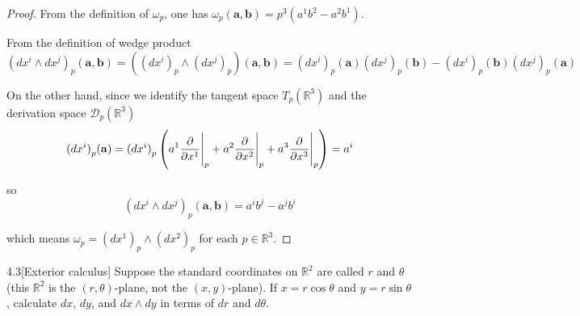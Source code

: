 \begin{proof}
	From the definition of \(\omega_{p}\), one has \(\omega_{p}(\mathbf{a}, \mathbf{b}) = p^{3}(a^{1}b^{2} - a^{2}b^{1})\).

	From the definition of wedge product
	\[
		{(dx^{i} \wedge dx^{j})}_{p}(\mathbf{a}, \mathbf{b}) = ({(dx^{i})}_{p} \wedge {(dx^{j})}_{p})(\mathbf{a}, \mathbf{b}) = {(dx^{i})}_{p}(\mathbf{a}) {(dx^{j})}_{p}(\mathbf{b}) - {(dx^{i})}_{p}(\mathbf{b}) {(dx^{j})}_{p}(\mathbf{a})
	\]

	On the other hand, since we identify the tangent space \( T_{p}(\mathbb{R}^{3}) \) and the derivation space \( \mathscr{D}_{p}(\mathbb{R}^{3}) \)
	\[
		{(dx^{i})}_{p}(\mathbf{a}) = {(dx^{i})}_{p}\left(a^{1}\frac{\partial}{\partial x^{1}}\Bigg{\vert}_{p} + a^{2}\frac{\partial}{\partial x^{2}}\Bigg{\vert}_{p} + a^{3}\frac{\partial}{\partial x^{3}}\Bigg{\vert}_{p}\right) = a^{i}
	\]

	so
	\[
		{(dx^{i} \wedge dx^{j})}_{p}(\mathbf{a}, \mathbf{b}) = a^{i}b^{j} - a^{j}b^{i}
	\]

	which means \( \omega_{p} = {(dx^{1})}_{p} \wedge {(dx^{2})}_{p} \) for each \(p\in \mathbb{R}^{3}\).
\end{proof}

\begin{problem}{4.3}[Exterior calculus]
Suppose the standard coordinates on \(\mathbb{R}^{2}\) are called \(r\) and \(\theta\) (this \(\mathbb{R}^{2}\) is the \((r,\theta)\)-plane, not the \((x,y)\)-plane). If \(x = r\cos\theta\) and \(y = r\sin\theta\), calculate \(dx\), \(dy\), and \(dx \wedge dy\) in terms of \(dr\) and \(d\theta\).
\end{problem}

